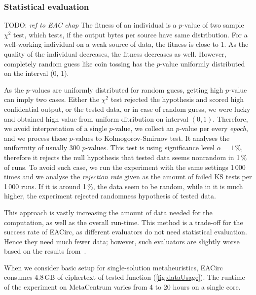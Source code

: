 \documentclass[
  print, %
  Table,   %
  nolof,     %
  nolot,     %
  11pt, %
  oneside  %
]{fithesis3}
\newcommand{\todo}[1]{TODO: \textit{#1}}
\begin{document}
\subsubsection{\textbf{Statistical evaluation}}
\label{subsubsec:method-spec-ss-stat}

\todo{ref to EAC chap}
The fitness of an individual is a $p$-value of two sample $\chi^{2}$ test, which tests, if the output bytes per source have same distribution. For a well-working individual on a weak source of data, the fitness is close to 1. As the quality of the individual decreases, the fitness decreases as well. However, completely random guess like coin tossing has the $p$-value uniformly distributed on the interval (0, 1).

As the $p$-values are uniformly distributed for random guess, getting high $p$-value can imply two cases. Either the $\chi^{2}$ test rejected the hypothesis and scored high confidential output, or the tested data, or in case of random guess, we were lucky and obtained high value from uniform ditribution on interval $(0, 1)$. Therefore, we avoid interpretation of a single $p$-value, we collect an $p$-value per every \textit{epoch}, and we process these $p$-values to Kolmogorov-Smirnov test. It analyses the uniformity of usually 300 $p$-values. This test is using significance level $\alpha = 1\,\%$, therefore it rejects the null hypothesis that tested data seems nonrandom in 1\,\% of runs. To avoid such case, we run the experiment with the same settings 1\,000 times and we analyse the \textit{rejection rate} given as the amount of failed KS tests per 1\,000 runs. If it is around 1\,\%, the data seem to be random, while in it is much higher, the experiment rejected randomness hypothesis of tested data.

This approach is vastly increasing the amount of data needed for the computation, as well as the overall run-time. This method is a trade-off for the success rate of EACirc, as different evaluators do not need statistical evaluation. Hence they need much fewer data; however, such evaluators are slightly worse based on the results from~\cite{svenda2013towards}.

When we consider basic setup for single-solution metaheuristics, EACirc consumes 4.8\,GB of ciphertext of tested function (\cref{fig:dataUsage}). The runtime of the experiment on MetaCentrum varies from 4 to 20 hours on a single core.
\end{document}
